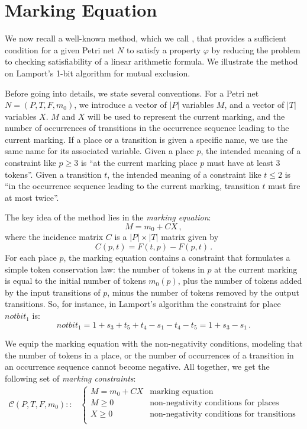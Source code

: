\section{Marking Equation}
\label{sec_method_safety}

We now recall a well-known method, which we call \safety, that provides a sufficient
condition for a given Petri net $N$ to satisfy a property $\varphi$ 
by reducing the problem to checking satisfiability of a linear arithmetic formula.
We illustrate the method on Lamport's 1-bit algorithm for mutual
exclusion. 

Before going into details, we state several conventions. For a
Petri net $N = (P, T, F, m_0)$, we introduce a vector of
$|P|$ variables $M$, and a vector of $|T|$ variables $X$.
$M$ and $X$ will be used to represent the current
marking, and the number of occurrences
of transitions in the occurrence sequence leading to the current marking.
If a place or a transition is given a specific
name, we use the same name for its associated variable. Given a place
$p$, the intended meaning of a constraint like $p \geq 3$ is 
``at the current marking place $p$ must have at least 3 tokens''. 
Given a transition $t$, the intended meaning of a constraint like $t \leq 2$ is ``in
the occurrence sequence leading to the current marking, transition $t$
must fire at most twice''. 

The key idea of the \safety{} method lies in the \emph{marking
  equation}:
$$M = m_0 + C X\,,$$
where the incidence matrix $C$ is a $|P| \times |T|$ matrix given by
$$C(p,t) = F(t,p) - F(p,t)\,.$$
For each place $p$, the marking equation contains a constraint
that formulates a simple token conservation law: the number of tokens in
$p$ at the current marking is equal to the initial number of tokens $m_0(p)$,
plus the number of tokens added by the input transitions of $p$, minus
the number of tokens removed by the output transitions. 
So, for instance, in Lamport's algorithm the constraint for place $notbit_1$
is:
$$notbit_1 = 1 + s_3 + t_5 + t_4 - s_1 - t_4 - t_5 = 1 +s_3
-s_1\,.$$

We equip the marking equation with the non-negativity conditions,
modeling that the number of tokens in a place, or the number of
occurrences of a transition in an occurrence sequence cannot become
negative. All together, we get the following set of \emph{marking constraints}:
\begin{align*}
  \mathcal{C}(P, T, F, m_0) ::&
  \begin{cases}
    M = m_0 + C X  & \text{marking equation} \\
    M \ge 0        & \text{non-negativity conditions for places} \\
    X \ge 0        & \text{non-negativity conditions for transitions} \\
  \end{cases}
\end{align*}

